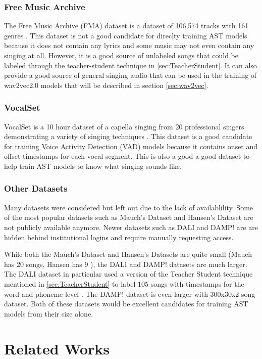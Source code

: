 \documentclass[letterpaper, 12pt]{article}
\begin{document}
\begin{multicols*}{2}
\subsubsection{Free Music Archive}
The Free Music Archive (FMA) dataset is a dataset of 106,574 tracks with 161 genres \citep{FMA}. This
dataset is not a good candidate for direclty training AST models because it does not contain any lyrics
and some music may not even contain any singing at all. However, it is a good source of unlabeled
songs that could be labeled through the teacher-student technique in \ref{sec:TeacherStudent}. It
can also provide a good source of general singing audio that can be used in the
training of wav2vec2.0 models that will be described in section \ref{sec:wav2vec}.

\subsubsection{VocalSet}
VocalSet is a 10 hour dataset of a capella singing from 20 professional singers
demonstrating a variety of singing techniques \citep{VocalSet}. This dataset is a good candidate for
training Voice Activity Detection (VAD) models because it contains onset and offset timestamps for
each vocal segment. This is also a good a good dataset to help train AST models to know what singing
sounds like.

\subsubsection{Other Datasets}
Many datasets were considered but left out due to the lack of availablility. Some of the most
popular datasets such as Mauch's Dataset \citep{mirex2021} and Hansen's Dataset \citep{Hansen} are
not publicly available anymore. Newer datasets such as DALI \citep{DALI} and DAMP! \citep{DAMP} are
are hidden behind institutional logins and require manually requesting access.

While both the Mauch's Dataset and Hansen's Datasets are quite small (Mauch has 20 songs, Hansen has
9 \citep{mirex2021}), the DALI and DAMP! datasets are much larger. The DALI dataset in particular
used a version of the Teacher Student technique mentioned in \ref{sec:TeacherStudent} to label 105
songs with timestamps for the word and phoneme level \citep{DALI}. The DAMP! dataset is even larger
with 300x30x2 song dataset. Both of these datasets would be excellent candidates for training AST
models from their size alone.

\section{Related Works}

\end{multicols*}
\end{document}
